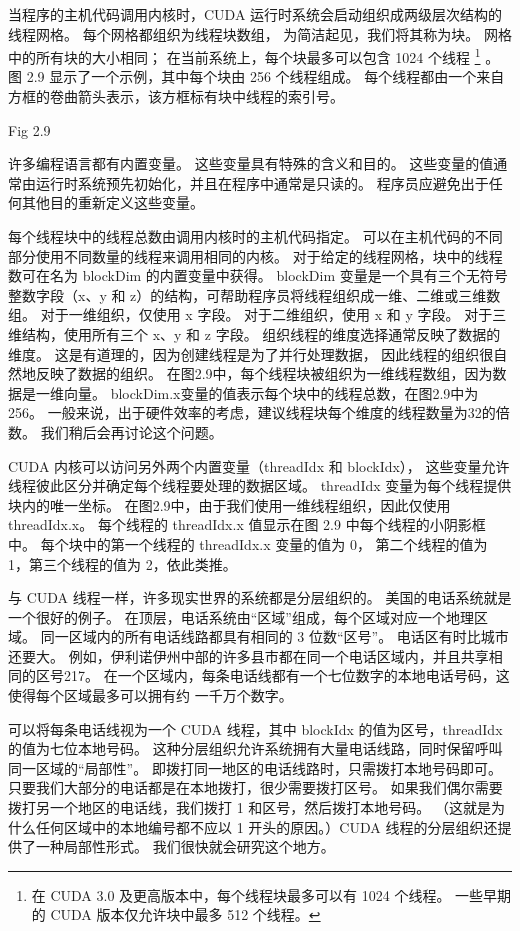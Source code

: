 当程序的主机代码调用内核时，CUDA 运行时系统会启动组织成两级层次结构的线程网格。 每个网格都组织为线程块数组，
为简洁起见，我们将其称为块。 网格中的所有块的大小相同； 在当前系统上，每个块最多可以包含 1024 个线程
\footnote{在 CUDA 3.0 及更高版本中，每个线程块最多可以有 1024 个线程。 
一些早期的 CUDA 版本仅允许块中最多 512 个线程。} 。 
图 2.9 显示了一个示例，其中每个块由 256 个线程组成。 
每个线程都由一个来自方框的卷曲箭头表示，该方框标有块中线程的索引号。

{\color{red} Fig 2.9}

\begin{remark}[内置变量]
	许多编程语言都有内置变量。 这些变量具有特殊的含义和目的。 
	这些变量的值通常由运行时系统预先初始化，并且在程序中通常是只读的。 程序员应避免出于任何其他目的重新定义这些变量。
\end{remark}

每个线程块中的线程总数由调用内核时的主机代码指定。 可以在主机代码的不同部分使用不同数量的线程来调用相同的内核。 
对于给定的线程网格，块中的线程数可在名为 blockDim 的内置变量中获得。 
blockDim 变量是一个具有三个无符号整数字段（x、y 和 z）的结构，可帮助程序员将线程组织成一维、二维或三维数组。 
对于一维组织，仅使用 x 字段。 对于二维组织，使用 x 和 y 字段。 对于三维结构，使用所有三个 x、y 和 z 字段。 
组织线程的维度选择通常反映了数据的维度。 这是有道理的，因为创建线程是为了并行处理数据，
因此线程的组织很自然地反映了数据的组织。 在图2.9中，每个线程块被组织为一维线程数组，因为数据是一维向量。 
blockDim.x变量的值表示每个块中的线程总数，在图2.9中为256。 
一般来说，出于硬件效率的考虑，建议线程块每个维度的线程数量为32的倍数。 我们稍后会再讨论这个问题。

CUDA 内核可以访问另外两个内置变量（threadIdx 和 blockIdx），
这些变量允许线程彼此区分并确定每个线程要处理的数据区域。 threadIdx 变量为每个线程提供块内的唯一坐标。 
在图2.9中，由于我们使用一维线程组织，因此仅使用threadIdx.x。 
每个线程的 threadIdx.x 值显示在图 2.9 中每个线程的小阴影框中。 每个块中的第一个线程的 threadIdx.x 变量的值为 0，
第二个线程的值为 1，第三个线程的值为 2，依此类推。

\begin{remark}[层级组织]
与 CUDA 线程一样，许多现实世界的系统都是分层组织的。 美国的电话系统就是一个很好的例子。 
在顶层，电话系统由“区域”组成，每个区域对应一个地理区域。 同一区域内的所有电话线路都具有相同的 3 位数“区号”。 
电话区有时比城市还要大。 例如，伊利诺伊州中部的许多县市都在同一个电话区域内，并且共享相同的区号217。
在一个区域内，每条电话线都有一个七位数字的本地电话号码，这使得每个区域最多可以拥有约 一千万个数字。

可以将每条电话线视为一个 CUDA 线程，其中 blockIdx 的值为区号，threadIdx 的值为七位本地号码。 
这种分层组织允许系统拥有大量电话线路，同时保留呼叫同一区域的“局部性”。 
即拨打同一地区的电话线路时，只需拨打本地号码即可。 只要我们大部分的电话都是在本地拨打，很少需要拨打区号。 
如果我们偶尔需要拨打另一个地区的电话线，我们拨打 1 和区号，然后拨打本地号码。 
（这就是为什么任何区域中的本地编号都不应以 1 开头的原因。）CUDA 线程的分层组织还提供了一种局部性形式。 
我们很快就会研究这个地方。
\end{remark}

